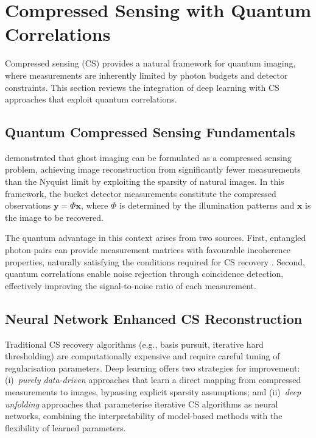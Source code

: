 \section{Compressed Sensing with Quantum Correlations}
\label{sec:compressed_sensing}

Compressed sensing (CS) provides a natural framework for quantum imaging, where measurements are inherently limited by photon budgets and detector constraints. This section reviews the integration of deep learning with CS approaches that exploit quantum correlations.

\subsection{Quantum Compressed Sensing Fundamentals}

\citet{katz2009} demonstrated that ghost imaging can be formulated as a compressed sensing problem, achieving image reconstruction from significantly fewer measurements than the Nyquist limit by exploiting the sparsity of natural images. In this framework, the bucket detector measurements constitute the compressed observations $\mathbf{y} = \Phi \mathbf{x}$, where $\Phi$ is determined by the illumination patterns and $\mathbf{x}$ is the image to be recovered.

The quantum advantage in this context arises from two sources. First, entangled photon pairs can provide measurement matrices with favourable incoherence properties, naturally satisfying the conditions required for CS recovery \citep{donoho2006, candes2006}. Second, quantum correlations enable noise rejection through coincidence detection, effectively improving the signal-to-noise ratio of each measurement.

\subsection{Neural Network Enhanced CS Reconstruction}

Traditional CS recovery algorithms (e.g., basis pursuit, iterative hard thresholding) are computationally expensive and require careful tuning of regularisation parameters. Deep learning offers two strategies for improvement: (i)~\emph{purely data-driven} approaches that learn a direct mapping from compressed measurements to images, bypassing explicit sparsity assumptions; and (ii)~\emph{deep unfolding} approaches that parameterise iterative CS algorithms as neural networks, combining the interpretability of model-based methods with the flexibility of learned parameters.

